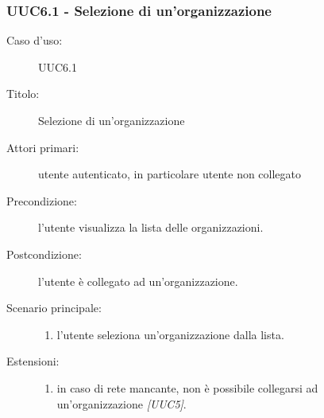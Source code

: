 \documentclass[../../../analisi-dei-requisiti.tex]{subfiles}
\begin{document}
\subsubsection{UUC6.1 - Selezione di un'organizzazione}%
\label{subs:UUC6.1}
\begin{description}
  \item[Caso d’uso:] UUC6.1
  \item[Titolo:] Selezione di un'organizzazione
  \item[Attori primari:] utente autenticato, in particolare utente non collegato
  \item[Precondizione:] l'utente visualizza la lista delle organizzazioni.
  \item[Postcondizione:] l'utente è collegato ad un'organizzazione.
  \item[Scenario principale:]
        \begin{enumerate}
          \item l'utente seleziona un'organizzazione dalla lista.
        \end{enumerate}
  \item[Estensioni:]
        \begin{enumerate}
          \item in caso di rete mancante, non è possibile collegarsi ad un'organizzazione \emph{[UUC5]}.
        \end{enumerate}
\end{description}
\end{document}

